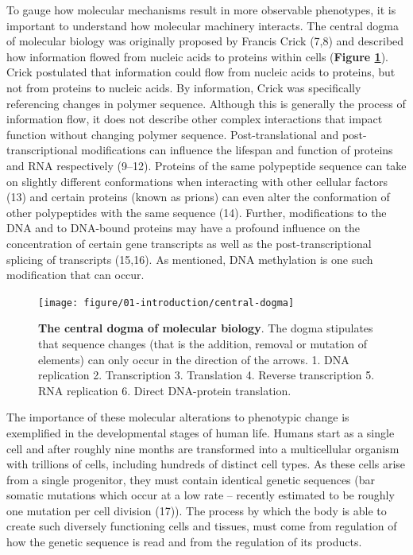 \documentclass[11pt,twoside]{bristolthesis}
\begin{document}
To gauge how molecular mechanisms result in more observable phenotypes, it is important to understand how molecular machinery interacts. The central dogma of molecular biology was originally proposed by Francis Crick (7,8) and described how information flowed from nucleic acids to proteins within cells (\textbf{Figure \ref{fig:central-dogma}}). Crick postulated that information could flow from nucleic acids to proteins, but not from proteins to nucleic acids. By information, Crick was specifically referencing changes in polymer sequence. Although this is generally the process of information flow, it does not describe other complex interactions that impact function without changing polymer sequence. Post-translational and post-transcriptional modifications can influence the lifespan and function of proteins and RNA respectively (9--12). Proteins of the same polypeptide sequence can take on slightly different conformations when interacting with other cellular factors (13) and certain proteins (known as prions) can even alter the conformation of other polypeptides with the same sequence (14). Further, modifications to the DNA and to DNA-bound proteins may have a profound influence on the concentration of certain gene transcripts as well as the post-transcriptional splicing of transcripts (15,16). As mentioned, DNA methylation is one such modification that can occur.




\begin{figure}

{\centering \texttt{[image: figure/01-introduction/central-dogma]} 

}

\caption[The central dogma of molecular biology]{\textbf{The central dogma of molecular biology}. The dogma stipulates that sequence changes (that is the addition, removal or mutation of elements) can only occur in the direction of the arrows. 1. DNA replication 2. Transcription 3. Translation 4. Reverse transcription 5. RNA replication 6. Direct DNA-protein translation.}\label{fig:central-dogma}
\end{figure}
The importance of these molecular alterations to phenotypic change is exemplified in the developmental stages of human life. Humans start as a single cell and after roughly nine months are transformed into a multicellular organism with trillions of cells, including hundreds of distinct cell types. As these cells arise from a single progenitor, they must contain identical genetic sequences (bar somatic mutations which occur at a low rate -- recently estimated to be roughly one mutation per cell division (17)). The process by which the body is able to create such diversely functioning cells and tissues, must come from regulation of how the genetic sequence is read and from the regulation of its products.
\end{document}
